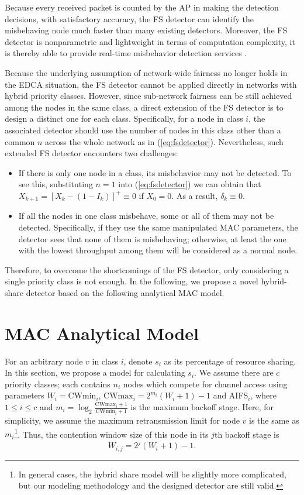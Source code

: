 \documentclass[conference]{IEEEtran}
\begin{document}
Because every received packet is counted by the AP in making the detection decisions, with satisfactory accuracy, the FS detector can identify the misbehaving node much faster than many existing detectors. Moreover, the FS detector is nonparametric and lightweight in terms of computation complexity, it is thereby able to provide real-time misbehavior detection services \cite{tang2014real}.

Because the underlying assumption of network-wide fairness no longer holds in the EDCA situation, the FS detector cannot be applied directly in networks with hybrid priority classes. However, since sub-network fairness can be still achieved among the nodes in the same class, a direct extension of the FS detector is to design a distinct one for each class. Specifically, for a node in class $i$, the associated detector should use the number of nodes in this class other than a common $n$ across the whole network as in (\ref{eq:fsdetector}). Nevertheless, such extended FS detector encounters two challenges:
\begin{itemize}
\item If there is only one node in a class, its misbehavior may not be detected. To see this, substituting $n=1$ into (\ref{eq:fsdetector}) we can obtain that $X_{k+1}=[X_k-(1-I_k)]^+\equiv 0$ if $X_0=0$. As a result, $\delta_k\equiv 0$.
\item If all the nodes in one class misbehave, some or all of them may not be detected. Specifically, if they use the same manipulated MAC parameters, the detector sees that none of them is misbehaving; otherwise, at least the one with the lowest throughput among them will be considered as a normal node.
\end{itemize}

Therefore, to overcome the shortcomings of the FS detector, only considering a single priority class is not enough. In the following, we propose a novel hybrid-share detector based on the following analytical MAC model.

\section{MAC Analytical Model}\label{sec:model}
For an arbitrary node $v$ in class $i$, denote $s_i$ as its percentage of resource sharing. In this section, we propose a model for calculating $s_i$. We assume there are $c$ priority classes; each contains $n_i$ nodes which compete for channel access using parameters $W_{i}=\textrm{CWmin}_i$, $\textrm{CWmax}_{i}=2^{m_i}(W_{i}+1)-1$ and AIFS$_i$, where $1\leq i\leq c$ and $m_i=\log_{2}\frac{\textrm{CWmax}_{i}+1}{\textrm{CWmin}_{i}+1}$ is the maximum backoff stage. Here, for simplicity, we assume the maximum retransmission limit for node $v$ is the same as $m_i$\footnote{In general cases, the hybrid share model will be slightly more complicated, but our modeling methodology and the designed detector are still valid.}. Thus, the contention window size of this node in its $j$th backoff stage is
\begin{equation}
    W_{i,j} = 2^j(W_{i}+1)-1.
\end{equation}
\end{document}
